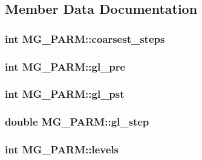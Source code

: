 \subsection{Member Data Documentation}
\hypertarget{struct_m_g___p_a_r_m_a5b69ace4bfa31087f461224cec080ec0}{
\subsubsection[{coarsest\-\_\-steps}]{\setlength{\rightskip}{0pt plus 5cm}int M\-G\-\_\-\-P\-A\-R\-M\-::coarsest\-\_\-steps}}\label{struct_m_g___p_a_r_m_a5b69ace4bfa31087f461224cec080ec0}
\hypertarget{struct_m_g___p_a_r_m_a96da8d229d04a0f264b25200eac19c7c}{
\subsubsection[{gl\-\_\-pre}]{\setlength{\rightskip}{0pt plus 5cm}int M\-G\-\_\-\-P\-A\-R\-M\-::gl\-\_\-pre}}\label{struct_m_g___p_a_r_m_a96da8d229d04a0f264b25200eac19c7c}
\hypertarget{struct_m_g___p_a_r_m_a53badc2f0989f28b0dd7cbd4d84f424a}{
\subsubsection[{gl\-\_\-pst}]{\setlength{\rightskip}{0pt plus 5cm}int M\-G\-\_\-\-P\-A\-R\-M\-::gl\-\_\-pst}}\label{struct_m_g___p_a_r_m_a53badc2f0989f28b0dd7cbd4d84f424a}
\hypertarget{struct_m_g___p_a_r_m_ad97b113e8a23ed462c7a3b631be58550}{
\subsubsection[{gl\-\_\-step}]{\setlength{\rightskip}{0pt plus 5cm}double M\-G\-\_\-\-P\-A\-R\-M\-::gl\-\_\-step}}\label{struct_m_g___p_a_r_m_ad97b113e8a23ed462c7a3b631be58550}
\hypertarget{struct_m_g___p_a_r_m_a4e9bf1680b7f9689bb23c13e1789ca48}{
\subsubsection[{levels}]{\setlength{\rightskip}{0pt plus 5cm}int M\-G\-\_\-\-P\-A\-R\-M\-::levels}}\label{struct_m_g___p_a_r_m_a4e9bf1680b7f9689bb23c13e1789ca48}
